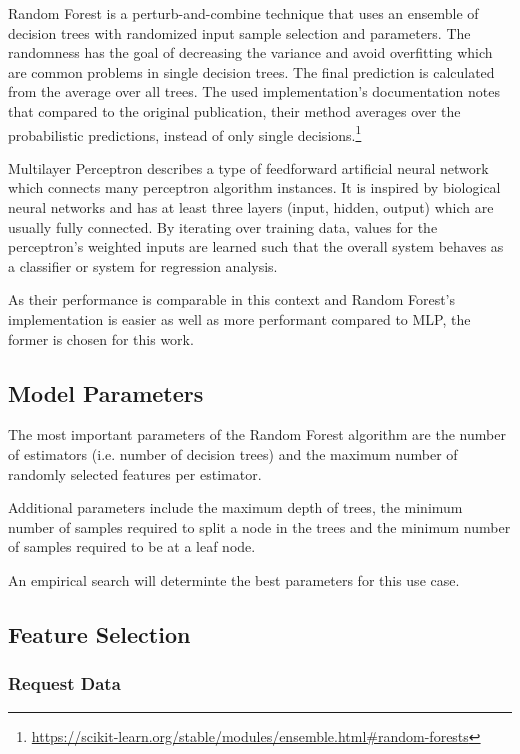 \documentclass[
    fontsize=12pt,
    headings=small,
    parskip=half,           %
    bibliography=totoc,
    numbers=noenddot,       %
    open=any,               %
    final                   %
]{scrreprt}
\begin{document}
Random Forest\cite{Breiman2001} is a perturb-and-combine technique that uses an ensemble of decision trees with randomized input sample selection and parameters. The randomness has the goal of decreasing the variance and avoid overfitting which are common problems in single decision trees. The final prediction is calculated from the average over all trees. The used implementation's documentation notes that compared to the original publication, their method averages over the probabilistic predictions, instead of only single decisions.\footnote{\url{https://scikit-learn.org/stable/modules/ensemble.html\#random-forests}}

Multilayer Perceptron describes a type of feedforward artificial neural network which connects many perceptron algorithm instances. It is inspired by biological neural networks and has at least three layers (input, hidden, output) which are usually fully connected. By iterating over training data, values for the perceptron's weighted inputs are learned such that the overall system behaves as a classifier or system for regression analysis.

As their performance is comparable in this context and Random Forest's implementation is easier as well as more performant compared to MLP, the former is chosen for this work.

\subsection{Model Parameters}

The most important parameters of the Random Forest algorithm are the number of estimators (i.e. number of decision trees) and the maximum number of randomly selected features per estimator.

Additional parameters include the maximum depth of trees, the minimum number of samples required to split a node in the trees and the minimum number of samples required to be at a leaf node.

An empirical search will determinte the best parameters for this use case.

\subsection{Feature Selection}

\subsubsection{Request Data}
\end{document}
